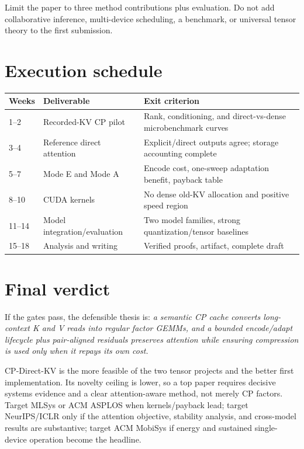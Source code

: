 \documentclass[11pt]{article}
\begin{document}
Limit the paper to three method contributions plus evaluation. Do not add collaborative inference,
multi-device scheduling, a benchmark, or universal tensor theory to the first submission.

\section{Execution schedule}

\begin{center}
\small
\renewcommand{\arraystretch}{1.2}
\begin{tabularx}{\textwidth}{@{}p{1.6cm}p{3.0cm}X@{}}
\toprule
\textbf{Weeks} & \textbf{Deliverable} & \textbf{Exit criterion} \\
\midrule
1--2 & Recorded-KV CP pilot & Rank, conditioning, and direct-vs-dense microbenchmark curves \\
3--4 & Reference direct attention & Explicit/direct outputs agree; storage accounting complete \\
5--7 & Mode E and Mode A & Encode cost, one-sweep adaptation benefit, payback table \\
8--10 & CUDA kernels & No dense old-KV allocation and positive speed region \\
11--14 & Model integration/evaluation & Two model families, strong quantization/tensor baselines \\
15--18 & Analysis and writing & Verified proofs, artifact, complete draft \\
\bottomrule
\end{tabularx}
\end{center}

\section{Final verdict}

\begin{claimbox}
If the gates pass, the defensible thesis is: \emph{a semantic CP cache converts long-context K and
V reads into regular factor GEMMs, and a bounded encode/adapt lifecycle plus pair-aligned residuals
preserves attention while ensuring compression is used only when it repays its own cost.}
\end{claimbox}

CP-Direct-KV is the more feasible of the two tensor projects and the better first implementation.
Its novelty ceiling is lower, so a top paper requires decisive systems evidence and a clear
attention-aware method, not merely CP factors. Target MLSys or ACM ASPLOS when kernels/payback lead;
target NeurIPS/ICLR only if the attention objective, stability analysis, and cross-model results are
substantive; target ACM MobiSys if energy and sustained single-device operation become the headline.
\end{document}
